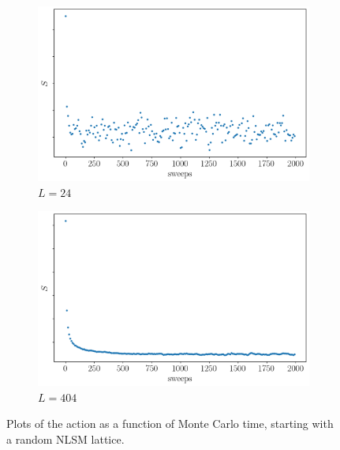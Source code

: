 \documentclass[a4paper,11pt]{article}
\begin{document}
\begin{figure}[h]
  \centering
      \begin{subfigure}[b]{0.5\textwidth}\centering
        \includegraphics[width=\textwidth]{therm24.png}
        \caption{$L=24$}
      \end{subfigure}%
      \hfill
      \begin{subfigure}[b]{0.5\textwidth}\centering
        \includegraphics[width=\textwidth]{therm404.png}
        \caption{$L=404$}
      \end{subfigure}
      \hfill
      \caption{\label{fig:therm} Plots of the action as a function of Monte Carlo time, starting with a random NLSM lattice.}
\end{figure}
\end{document}
